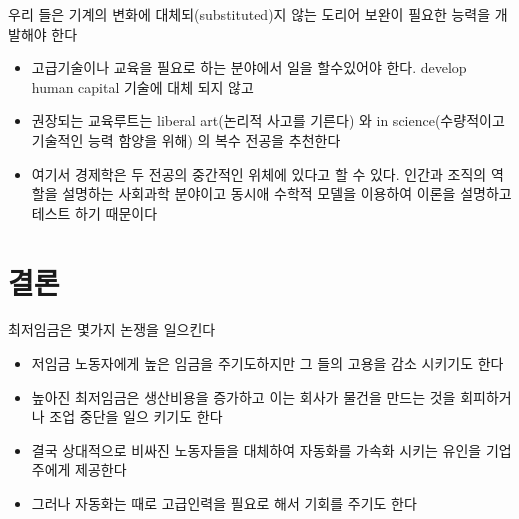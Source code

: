 \documentclass[
]{book}
\providecommand{\tightlist}{%
  \setlength{\itemsep}{0pt}\setlength{\parskip}{0pt}}
\begin{document}
우리 들은 기계의 변화에 대체되(substituted)지 않는 도리어 보완이 필요한 능력을 개발해야 한다

\begin{itemize}
\tightlist
\item
  고급기술이나 교육을 필요로 하는 분야에서 일을 할수있어야 한다. develop human capital 기술에 대체 되지 않고
\item
  권장되는 교육루트는 liberal art(논리적 사고를 기른다) 와 in science(수량적이고 기술적인 능력 함양을 위해) 의 복수 전공을 추천한다
\item
  여기서 경제학은 두 전공의 중간적인 위체에 있다고 할 수 있다. 인간과 조직의 역할을 설명하는 사회과학 분야이고 동시애 수학적 모델을 이용하여
  이론을 설명하고 테스트 하기 때문이다
\end{itemize}

\hypertarget{uxacb0uxb860-1}{%
\section{결론}\label{uxacb0uxb860-1}}

최저임금은 몇가지 논쟁을 일으킨다

\begin{itemize}
\tightlist
\item
  저임금 노동자에게 높은 임금을 주기도하지만 그 들의 고용을 감소 시키기도 한다
\item
  높아진 최저임금은 생산비용을 증가하고 이는 회사가 물건을 만드는 것을 회피하거나 조업 중단을 일으 키기도 한다
\item
  결국 상대적으로 비싸진 노동자들을 대체하여 자동화를 가속화 시키는 유인을 기업주에게 제공한다
\item
  그러나 자동화는 때로 고급인력을 필요로 해서 기회를 주기도 한다
\end{itemize}

  
\end{document}
